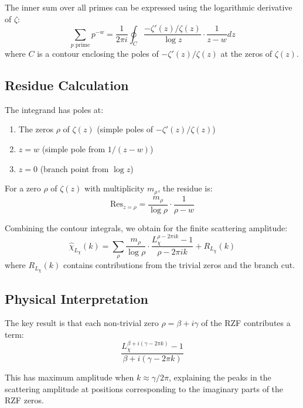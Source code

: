 \documentclass[11pt, oneside]{article}
\begin{document}
The inner sum over all primes can be expressed using the logarithmic derivative of $\zeta$:
\begin{equation}
\sum_{p \text{ prime}} p^{-w} = \frac{1}{2\pi i} \oint_C \frac{-\zeta'(z)/\zeta(z)}{\log z} \cdot \frac{1}{z-w} dz
\end{equation}
where $C$ is a contour enclosing the poles of $-\zeta'(z)/\zeta(z)$ at the zeros of $\zeta(z)$.

\subsection{Residue Calculation}

The integrand has poles at:
\begin{enumerate}
\item The zeros $\rho$ of $\zeta(z)$ (simple poles of $-\zeta'(z)/\zeta(z)$)
\item $z = w$ (simple pole from $1/(z-w)$)
\item $z = 0$ (branch point from $\log z$)
\end{enumerate}

For a zero $\rho$ of $\zeta(z)$ with multiplicity $m_\rho$, the residue is:
\begin{equation}
\text{Res}_{z=\rho} = \frac{m_\rho}{\log \rho} \cdot \frac{1}{\rho - w}
\end{equation}

Combining the contour integrals, we obtain for the finite scattering amplitude:
\begin{equation}
\hat{\chi}_{L_\chi}(k) = \sum_{\rho} \frac{m_\rho}{\log \rho} \cdot \frac{L_\chi^{\rho - 2\pi i k} - 1}{\rho - 2\pi i k} + R_{L_\chi}(k)
\end{equation}
where $R_{L_\chi}(k)$ contains contributions from the trivial zeros and the branch cut.

\subsection{Physical Interpretation}

The key result is that each non-trivial zero $\rho = \beta + i\gamma$ of the RZF contributes a term:
\begin{equation}
\frac{L_\chi^{\beta + i(\gamma - 2\pi k)} - 1}{\beta + i(\gamma - 2\pi k)}
\end{equation}

This has maximum amplitude when $k \approx \gamma/2\pi$, explaining the peaks in the scattering amplitude at positions corresponding to the imaginary parts of the RZF zeros.
\end{document}
